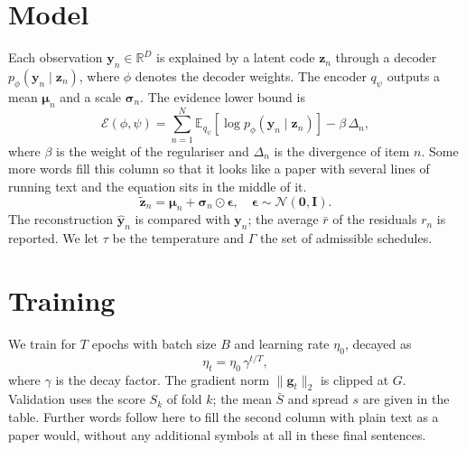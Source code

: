 \documentclass[10pt,twocolumn]{article}
\begin{document}
\section{Model}
Each observation $\mathbf{y}_n \in \mathbb{R}^{D}$ is explained by a latent code
$\mathbf{z}_n$ through a decoder $p_{\phi}(\mathbf{y}_n \mid \mathbf{z}_n)$, where $\phi$
denotes the decoder weights. The encoder $q_{\psi}$ outputs a mean $\bm{\mu}_n$ and a
scale $\bm{\sigma}_n$. The evidence lower bound is
\begin{equation}
  \mathcal{E}(\phi, \psi) = \sum_{n=1}^{N} \mathbb{E}_{q_{\psi}} [\log p_{\phi}(\mathbf{y}_n \mid \mathbf{z}_n)] - \beta \, \Delta_n,
\end{equation}
where $\beta$ is the weight of the regulariser and $\Delta_n$ is the divergence of item $n$.
Some more words fill this column so that it looks like a paper with several lines of
running text and the equation sits in the middle of it.
\begin{equation}
  \tilde{\mathbf{z}}_n = \bm{\mu}_n + \bm{\sigma}_n \odot \bm{\epsilon}, \quad \bm{\epsilon} \sim \mathcal{N}(\mathbf{0}, \mathbf{I}).
\end{equation}
The reconstruction $\hat{\mathbf{y}}_n$ is compared with $\mathbf{y}_n$; the average
$\bar{r}$ of the residuals $r_n$ is reported. We let $\tau$ be the temperature and $\Gamma$
the set of admissible schedules.
\section{Training}
We train for $T$ epochs with batch size $B$ and learning rate $\eta_0$, decayed as
\begin{equation}
  \eta_t = \eta_0 \, \gamma^{t / T},
\end{equation}
where $\gamma$ is the decay factor. The gradient norm $\|\mathbf{g}_t\|_2$ is clipped at
$G$. Validation uses the score $S_k$ of fold $k$; the mean $\bar{S}$ and spread $s$ are
given in the table. Further words follow here to fill the second column with plain text
as a paper would, without any additional symbols at all in these final sentences.
\end{document}
